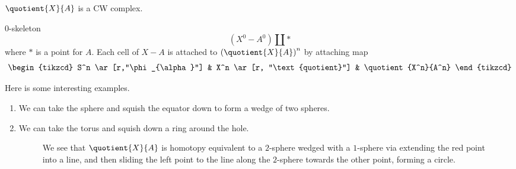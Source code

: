 \begin{remark}
	\(\quotient{X}{A} \) is a CW complex.
\end{remark}
\(0\)-skeleton
\[
	(X^0 - A^0)\coprod *
\]
where \(*\) is a point for \(A\). Each cell of \(X-A\) is attached to \(\left(\quotient{X}{A} \right)^n\)
by attaching map
\[
	\begin{tikzcd}
		S^n \ar[r,"\phi_{\alpha}"] & X^n \ar[r, "\text{quotient}"] & \quotient{X^n}{A^n}
	\end{tikzcd}
\]

\begin{eg}
	Here is some interesting examples.
	\begin{enumerate}
		\item We can take the sphere and squish the equator down to form a wedge of two spheres.
		      \begin{figure}[H]
			      \centering
			      \label{fig:eg:quotient-cw-complex-sphere}
		      \end{figure}
		\item We can take the torus and squish down a ring around the hole.
		      \begin{figure}[H]
			      \centering
			      \caption{We see that \(\quotient{X}{A}\) is homotopy equivalent to a \(2\)-sphere
				      wedged with a \(1\)-sphere via extending the red point into a line, and then
				      sliding the left point to the line along the \(2\)-sphere towards the other
				      point, forming a circle.}
			      \label{fig:eg:quotient-cw-complex-torus}
		      \end{figure}
	\end{enumerate}
\end{eg}
